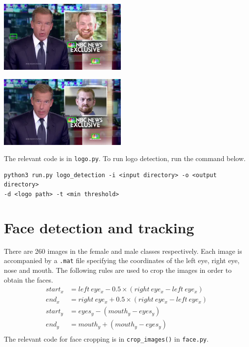 \documentclass{article}
\begin{document}
\vspace*{20pt}
\begin{minipage}{0.5\linewidth}
 \label{fig: logo_bad}
\centering
\includegraphics[width=2.5in]{../output/clip_1_logo/104.jpg}
\end{minipage}
\begin{minipage}{0.5\linewidth}
 \label{fig: logo_good}
\centering
\includegraphics[width=2.5in]{../output/clip_1_logo/052.jpg}
\end{minipage}
\vspace*{10pt}

The relevant code is in \texttt{logo.py}. To run logo detection, run the command below.
\begin{verbatim}
python3 run.py logo_detection -i <input directory> -o <output directory>
-d <logo path> -t <min threshold>
\end{verbatim}

\section{Face detection and tracking}
There are 260 images in the female and male classes respectively. Each image is accompanied by a \texttt{.mat} file specifying the coordinates of the left eye, right eye, nose and mouth. The following rules are used to crop the images in order to obtain the faces.
\begin{equation}
\begin{split}
start_x &= left~eye_x - 0.5\times(right~eye_x - left~eye_x) \\
end_x &= right~eye_x + 0.5\times(right~eye_x - left~eye_x) \\
start_y &= eyes_y - (mouth_y - eyes_y) \\
end_y &= mouth_y + (mouth_y - eyes_y) \\
\end{split}
\end{equation}
The relevant code for face cropping is in \texttt{crop\_images()} in \texttt{face.py}.
\end{document}
